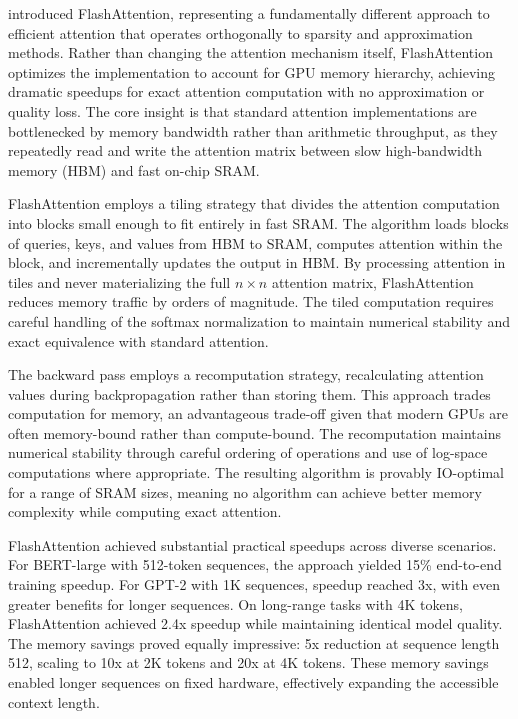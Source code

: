 \citet{dao2022flashattention} introduced FlashAttention, representing a fundamentally different approach to efficient attention that operates orthogonally to sparsity and approximation methods. Rather than changing the attention mechanism itself, FlashAttention optimizes the implementation to account for GPU memory hierarchy, achieving dramatic speedups for exact attention computation with no approximation or quality loss. The core insight is that standard attention implementations are bottlenecked by memory bandwidth rather than arithmetic throughput, as they repeatedly read and write the attention matrix between slow high-bandwidth memory (HBM) and fast on-chip SRAM.

FlashAttention employs a tiling strategy that divides the attention computation into blocks small enough to fit entirely in fast SRAM. The algorithm loads blocks of queries, keys, and values from HBM to SRAM, computes attention within the block, and incrementally updates the output in HBM. By processing attention in tiles and never materializing the full $n \times n$ attention matrix, FlashAttention reduces memory traffic by orders of magnitude. The tiled computation requires careful handling of the softmax normalization to maintain numerical stability and exact equivalence with standard attention.

The backward pass employs a recomputation strategy, recalculating attention values during backpropagation rather than storing them. This approach trades computation for memory, an advantageous trade-off given that modern GPUs are often memory-bound rather than compute-bound. The recomputation maintains numerical stability through careful ordering of operations and use of log-space computations where appropriate. The resulting algorithm is provably IO-optimal for a range of SRAM sizes, meaning no algorithm can achieve better memory complexity while computing exact attention.

FlashAttention achieved substantial practical speedups across diverse scenarios. For BERT-large with 512-token sequences, the approach yielded 15\% end-to-end training speedup. For GPT-2 with 1K sequences, speedup reached 3x, with even greater benefits for longer sequences. On long-range tasks with 4K tokens, FlashAttention achieved 2.4x speedup while maintaining identical model quality. The memory savings proved equally impressive: 5x reduction at sequence length 512, scaling to 10x at 2K tokens and 20x at 4K tokens. These memory savings enabled longer sequences on fixed hardware, effectively expanding the accessible context length.

